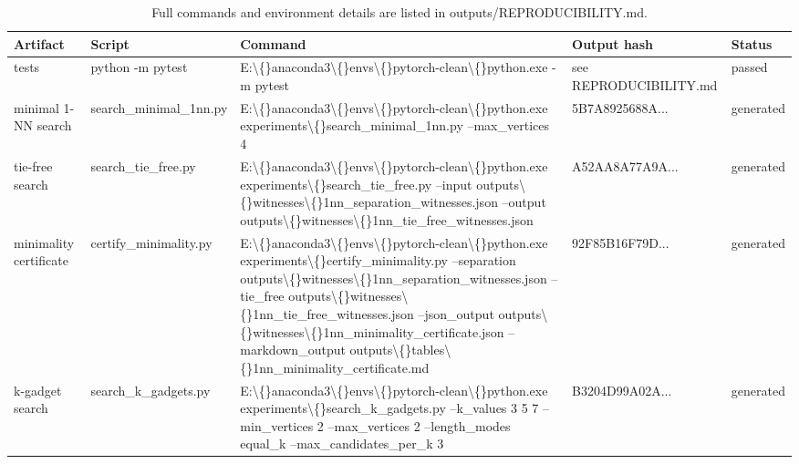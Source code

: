 \begin{table}[t]
\centering
\small
\begin{tabular}{lllll}
\toprule
Artifact & Script & Command & Output hash & Status \\
\midrule
tests & python -m pytest & E:\textbackslash\{\}anaconda3\textbackslash\{\}envs\textbackslash\{\}pytorch-clean\textbackslash\{\}python.exe -m pytest & see REPRODUCIBILITY.md & passed \\
minimal 1-NN search & search\_minimal\_1nn.py & E:\textbackslash\{\}anaconda3\textbackslash\{\}envs\textbackslash\{\}pytorch-clean\textbackslash\{\}python.exe experiments\textbackslash\{\}search\_minimal\_1nn.py --max\_vertices 4 & 5B7A8925688A... & generated \\
tie-free search & search\_tie\_free.py & E:\textbackslash\{\}anaconda3\textbackslash\{\}envs\textbackslash\{\}pytorch-clean\textbackslash\{\}python.exe experiments\textbackslash\{\}search\_tie\_free.py --input outputs\textbackslash\{\}witnesses\textbackslash\{\}1nn\_separation\_witnesses.json --output outputs\textbackslash\{\}witnesses\textbackslash\{\}1nn\_tie\_free\_witnesses.json & A52AA8A77A9A... & generated \\
minimality certificate & certify\_minimality.py & E:\textbackslash\{\}anaconda3\textbackslash\{\}envs\textbackslash\{\}pytorch-clean\textbackslash\{\}python.exe experiments\textbackslash\{\}certify\_minimality.py --separation outputs\textbackslash\{\}witnesses\textbackslash\{\}1nn\_separation\_witnesses.json --tie\_free outputs\textbackslash\{\}witnesses\textbackslash\{\}1nn\_tie\_free\_witnesses.json --json\_output outputs\textbackslash\{\}witnesses\textbackslash\{\}1nn\_minimality\_certificate.json --markdown\_output outputs\textbackslash\{\}tables\textbackslash\{\}1nn\_minimality\_certificate.md & 92F85B16F79D... & generated \\
k-gadget search & search\_k\_gadgets.py & E:\textbackslash\{\}anaconda3\textbackslash\{\}envs\textbackslash\{\}pytorch-clean\textbackslash\{\}python.exe experiments\textbackslash\{\}search\_k\_gadgets.py --k\_values 3 5 7 --min\_vertices 2 --max\_vertices 2 --length\_modes equal\_k --max\_candidates\_per\_k 3 & B3204D99A02A... & generated \\
\bottomrule
\end{tabular}
\caption*{\footnotesize Full commands and environment details are listed in outputs/REPRODUCIBILITY.md.}
\end{table}
